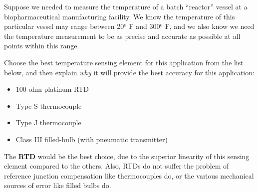 

Suppose we needed to measure the temperature of a batch ``reactor'' vessel at a biopharmaceutical manufacturing facility.  We know the temperature of this particular vessel may range between 20$^{o}$ F and 300$^{o}$ F, and we also know we need the temperature measurement to be as precise and accurate as possible at all points within this range.

Choose the best temperature sensing element for this application from the list below, and then explain {\it why} it will provide the best accuracy for this application:

\begin{itemize}
\item{} 100 ohm platinum RTD
\item{} Type S thermocouple
\item{} Type J thermocouple
\item{} Class III filled-bulb (with pneumatic transmitter)
\end{itemize}







The {\bf RTD} would be the best choice, due to the superior linearity of this sensing element compared to the others.  Also, RTDs do not suffer the problem of reference junction compensation like thermocouples do, or the various mechanical sources of error like filled bulbs do.











